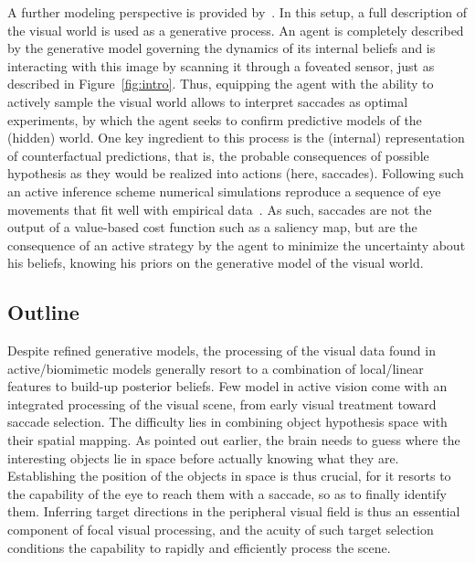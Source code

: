 A further modeling perspective is provided by~\cite{Friston12}. In this setup, a full description of the visual world is used as a generative process. An agent is completely described by the generative model governing the dynamics of its internal beliefs and is interacting with this image by scanning it through a foveated sensor, just as described in Figure~\ref{fig:intro}. Thus, equipping the agent with the ability to actively sample the visual world %
allows to interpret saccades as optimal experiments, by which the agent seeks to confirm predictive models of the (hidden) world. One key ingredient to this process is the (internal) representation of counterfactual predictions, that is, the probable consequences of possible hypothesis as they would be realized into actions (here, saccades). Following such an active inference scheme numerical simulations reproduce a sequence of eye movements that fit well with empirical data~\cite{Mirza18}. %
As such, saccades are not the output of a value-based cost function such as a saliency map, but
are the consequence of an active strategy by the agent to minimize the uncertainty about his beliefs, knowing his priors on the generative model of the visual world.

\subsection{Outline}

Despite refined generative models, the processing of the visual data found in active/biomimetic models generally resort to a combination of local/linear features to build-up posterior beliefs. Few model in active vision come with an integrated processing of the visual scene, from early visual treatment toward saccade selection. The difficulty lies in combining object hypothesis space with their spatial mapping. As pointed out earlier, the brain needs to guess where the interesting objects lie in space before actually knowing what they are. Establishing the position of the objects in space is thus crucial, for it resorts to the capability of the eye to reach them with a saccade, so as to finally identify them. Inferring target directions in the peripheral visual field is thus an essential component of focal visual processing, and the acuity of such target selection conditions the capability to rapidly and efficiently process the scene.

